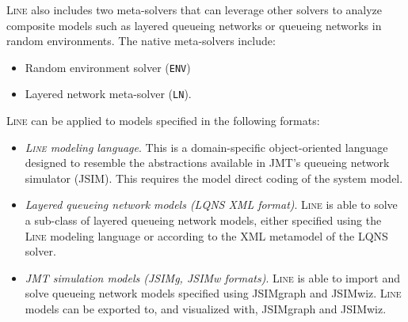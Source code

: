 \textsc{Line} also includes two meta-solvers that can leverage other solvers to analyze composite models such as layered queueing networks or queueing networks in random environments. The native meta-solvers include:
\begin{itemize}
\item Random environment solver (\texttt{ENV})
\item Layered network meta-solver (\texttt{LN}). 
\end{itemize}
\textsc{Line} can be applied to models specified in the following formats:
\begin{itemize}
\item {\em \textsc{Line} modeling language}. This is a domain-specific object-oriented language designed to resemble the abstractions available in JMT's queueing network simulator (JSIM). This requires the model direct coding of the system model.
\item {\em Layered queueing network models (LQNS XML format)}. \textsc{Line} is able to solve a sub-class of layered queueing network models, either specified using the \textsc{Line} modeling language or according to the XML metamodel of the LQNS solver. %
\item {\em JMT simulation models (JSIMg, JSIMw formats)}. \textsc{Line} is able to import and solve queueing network models specified using JSIMgraph and JSIMwiz. \textsc{Line} models can be exported to, and visualized with, JSIMgraph and JSIMwiz.
\end{itemize}



